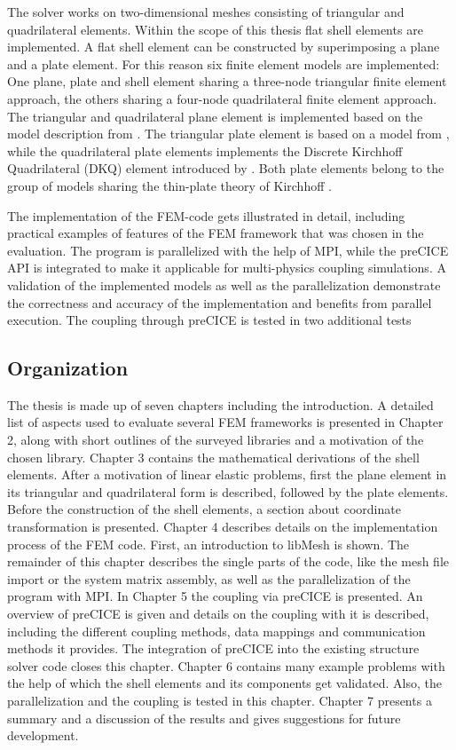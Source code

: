 The solver works on two-dimensional meshes consisting of triangular and quadrilateral elements. Within the scope of this thesis flat shell elements are implemented. A flat shell element can be constructed by superimposing a plane and a plate element. For this reason six finite element models are implemented: One plane, plate and shell element sharing a three-node triangular finite element approach, the others sharing a four-node quadrilateral finite element approach. The triangular and quadrilateral plane element is implemented based on the model description from \cite{steinke2005finite}. The triangular plate element is based on a model from \cite{specht1988modified}, while the quadrilateral plate elements implements the Discrete Kirchhoff Quadrilateral (DKQ) element introduced by \cite{zienkiewicz2000finite}. Both plate elements belong to the group of models sharing the thin-plate theory of Kirchhoff \cite{steinke2005finite}.

The implementation of the FEM-code gets illustrated in detail, including practical examples of features of the FEM framework that was chosen in the evaluation. The program is parallelized with the help of MPI, while the preCICE API is integrated to make it applicable for multi-physics coupling simulations. A validation of the implemented models as well as the parallelization demonstrate the correctness and accuracy of the implementation and benefits from parallel execution. The coupling through preCICE is tested in two additional tests

\subsection{Organization}
The thesis is made up of seven chapters including the introduction. A detailed list of aspects used to evaluate several FEM frameworks is presented in Chapter 2, along with short outlines of the surveyed libraries and a motivation of the chosen library. Chapter 3 contains the mathematical derivations of the shell elements. After a motivation of linear elastic problems, first the plane element in its triangular and quadrilateral form is described, followed by the plate elements. Before the construction of the shell elements, a section about coordinate transformation is presented. Chapter 4 describes details on the implementation process of the FEM code. First, an introduction to libMesh is shown. The remainder of this chapter describes the single parts of the code, like the mesh file import or the system matrix assembly, as well as the parallelization of the program with MPI. In Chapter 5 the coupling via preCICE is presented. An overview of preCICE is given and details on the coupling with it is described, including the different coupling methods, data mappings and communication methods it provides. The integration of preCICE into the existing structure solver code closes this chapter. Chapter 6 contains many example problems with the help of which the shell elements and its components get validated. Also, the parallelization and the coupling is tested in this chapter. Chapter 7 presents a summary and a discussion of the results and gives suggestions for future development.